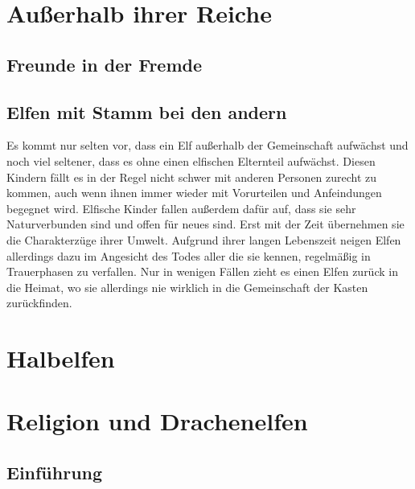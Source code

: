 \documentclass[a4paper,12pt,oneside]{book}
\begin{document}
\part{Außerhalb ihrer Reiche}
\chapter{Freunde in der Fremde}

\chapter{Elfen mit Stamm bei den andern}
Es kommt nur selten vor, dass ein Elf außerhalb der Gemeinschaft aufwächst und noch viel seltener, dass es ohne einen elfischen Elternteil aufwächst. Diesen Kindern fällt es in der Regel nicht schwer mit anderen Personen zurecht zu kommen, auch wenn ihnen immer wieder mit Vorurteilen und Anfeindungen begegnet wird. Elfische Kinder fallen außerdem dafür auf, dass sie sehr Naturverbunden sind und offen für neues sind. Erst mit der Zeit übernehmen sie die Charakterzüge ihrer Umwelt. Aufgrund ihrer langen Lebenszeit neigen Elfen allerdings dazu im Angesicht des Todes aller die sie kennen, regelmäßig in Trauerphasen zu verfallen. Nur in wenigen Fällen zieht es einen Elfen zurück in die Heimat, wo sie allerdings nie wirklich in die Gemeinschaft der Kasten zurückfinden.

\part{Halbelfen}

\part{Religion und Drachenelfen}
\chapter{Einführung}
\end{document}
